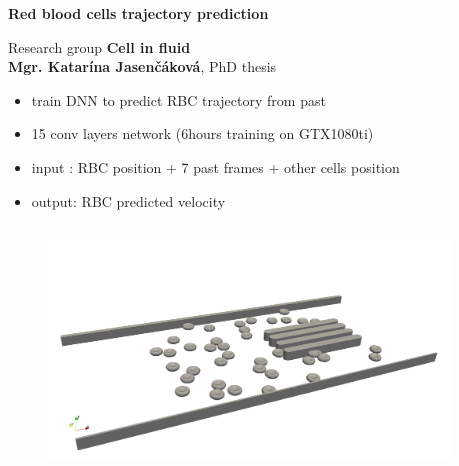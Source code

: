 \documentclass[xcolor=dvipsnames]{beamer}
\begin{document}
\begin{frame}{\bf Red blood cells trajectory prediction}

    Research group {\bf Cell in fluid} \\
    {\bf Mgr. Katarína Jasenčáková}, PhD thesis

    \begin{itemize}
      \item train DNN to predict RBC trajectory from past
      \item 15 conv layers network (6hours training on GTX1080ti)
      \item input : RBC position + 7 past frames + other cells position
      \item output: RBC predicted velocity
    \end{itemize}



    \begin{columns}
        \begin{column}{0.5\textwidth}

        \begin{figure}
          \includegraphics[scale=0.08]{../../pictures/rbc_channel.png}
        \end{figure}


        \end{column}

        \begin{column}{0.5\textwidth}  %


\end{column}
\end{columns}
\end{frame}
\end{document}
